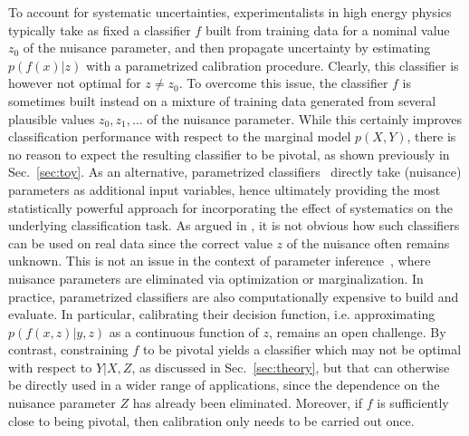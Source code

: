 \documentclass[twocolumn,superscriptaddress,aps]{revtex4-1}
\theoremstyle{plain}
\begin{document}
To account for systematic uncertainties, experimentalists in high energy physics
typically take as fixed a classifier $f$ built from training data for a nominal
value $z_0$ of the nuisance parameter, and then propagate uncertainty
 by estimating $p(f(x)|z)$ with a parametrized calibration
procedure. Clearly, this classifier is however not optimal for $z \neq z_0$.
To overcome this issue, the classifier $f$ is sometimes built instead on a mixture
of training data generated from several plausible values $z_0, z_1, \dots$ of the nuisance parameter.
While this certainly improves classification performance with respect to the marginal model $p(X,Y)$,
there is no reason to expect the resulting classifier to be pivotal, as shown
previously in Sec.~\ref{sec:toy}.
As an alternative, parametrized
classifiers~\citep{cranmer2015approximating,Baldi:2016fzo} directly take
(nuisance) parameters as additional input variables, hence ultimately providing
the most statistically powerful approach for incorporating the effect of
systematics on the underlying classification task.  As argued in
\citep{Neal:2007zz}, it is not obvious how such classifiers can be used on real data since
the correct value $z$ of the nuisance often remains unknown. This is
not an issue in the context of parameter
inference~\citep{cranmer2015approximating}, where nuisance parameters are
eliminated via optimization or marginalization.
In practice, parametrized classifiers  are also computationally expensive to build
and evaluate. In particular, calibrating their decision function, i.e.
approximating $p(f(x,z)|y,z)$ as a continuous function of $z$, remains an open
challenge. By contrast, constraining $f$ to be pivotal yields a classifier which
may not be optimal with respect to $Y|X,Z$, as discussed in
Sec.~\ref{sec:theory}, but that can otherwise be directly used in a wider range of
applications, since the dependence on the nuisance parameter $Z$ has already been eliminated.
Moreover, if $f$ is sufficiently close to being pivotal, then calibration only needs to be carried out once.




\end{document}
